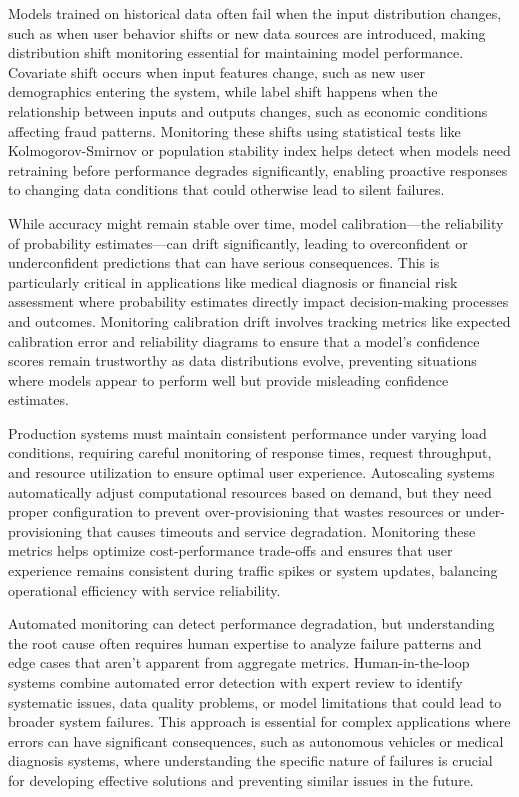 Models trained on historical data often fail when the input distribution changes, such as when user behavior shifts or new data sources are introduced, making distribution shift monitoring essential for maintaining model performance. Covariate shift occurs when input features change, such as new user demographics entering the system, while label shift happens when the relationship between inputs and outputs changes, such as economic conditions affecting fraud patterns. Monitoring these shifts using statistical tests like Kolmogorov-Smirnov or population stability index helps detect when models need retraining before performance degrades significantly, enabling proactive responses to changing data conditions that could otherwise lead to silent failures.

While accuracy might remain stable over time, model calibration—the reliability of probability estimates—can drift significantly, leading to overconfident or underconfident predictions that can have serious consequences. This is particularly critical in applications like medical diagnosis or financial risk assessment where probability estimates directly impact decision-making processes and outcomes. Monitoring calibration drift involves tracking metrics like expected calibration error and reliability diagrams to ensure that a model's confidence scores remain trustworthy as data distributions evolve, preventing situations where models appear to perform well but provide misleading confidence estimates.

Production systems must maintain consistent performance under varying load conditions, requiring careful monitoring of response times, request throughput, and resource utilization to ensure optimal user experience. Autoscaling systems automatically adjust computational resources based on demand, but they need proper configuration to prevent over-provisioning that wastes resources or under-provisioning that causes timeouts and service degradation. Monitoring these metrics helps optimize cost-performance trade-offs and ensures that user experience remains consistent during traffic spikes or system updates, balancing operational efficiency with service reliability.

Automated monitoring can detect performance degradation, but understanding the root cause often requires human expertise to analyze failure patterns and edge cases that aren't apparent from aggregate metrics. Human-in-the-loop systems combine automated error detection with expert review to identify systematic issues, data quality problems, or model limitations that could lead to broader system failures. This approach is essential for complex applications where errors can have significant consequences, such as autonomous vehicles or medical diagnosis systems, where understanding the specific nature of failures is crucial for developing effective solutions and preventing similar issues in the future.

